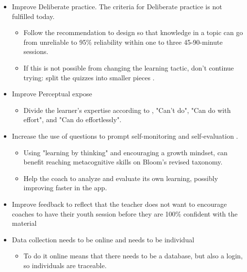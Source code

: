   \begin{itemize}
    \item Improve Deliberate practice. The criteria for Deliberate practice is not fulfilled today.
    \begin{itemize}
      \item  Follow the recommendation to design so that knowledge in a topic can go from unreliable to 95\% reliability within one to three 45-90-minute sessions.
      \item If this is not possible from changing the learning tactic, don't continue trying: split the quizzes into smaller pieces \citep{sierra}.
    \end{itemize}
    \item Improve Perceptual expose
    \begin{itemize}
      \item Divide the learner's expertise according to \cite{sierra}, "Can't do", "Can do with effort", and "Can do effortlessly".
    \end{itemize}
    \item Increase the use of questions to prompt self-monitoring  and self-evaluation \citep{sitzmann}.
    \begin{itemize}
      \item Using "learning by thinking" and encouraging a growth mindset, can benefit reaching metacognitive skills on Bloom's revised taxonomy.
      \item Help the coach to analyze and evaluate its own learning, possibly improving faster in the app.
    \end{itemize}
    \item Improve feedback to reflect that the teacher does not want to encourage coaches to have their youth session before they are 100\% confident with the material
    \item Data collection needs to be online and needs to be individual
    \begin{itemize}
      \item To do it online means that there needs to be a database, but also a login, so individuals are traceable.
    \end{itemize}
  \end{itemize}
